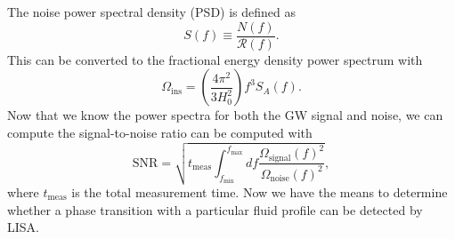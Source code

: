 The noise power spectral density (PSD) is defined as
\cite[eq. 3.1]{gowling_lisa_2021}
\begin{equation}
S(f) \equiv \frac{N(f)}{\mathcal{R}(f)}.
\end{equation}
This can be converted to the fractional energy density power spectrum with
\cites[eq. 3.8]{gowling_lisa_2021}[eq. 59]{smith_lisa_2019}
\begin{equation}
\Omega_\text{ins} = \left( \frac{4 \pi^2}{3 H_0^2} \right) f^3 S_A(f).
\end{equation}
Now that we know the power spectra for both the GW signal and noise, we can compute the signal-to-noise ratio can be computed with
\cites[eq. 50]{smith_lisa_2019}[eq. 33]{caprini_detecting_2020}[eq. 21]{thrane_sensitivity_2013}
\begin{equation}
\text{SNR} = \sqrt{t_\text{meas} \int_{f_\text{min}}^{f_\text{max}} df \frac{\Omega_\text{signal}(f)^2}{\Omega_\text{noise}(f)^2}},
\end{equation}
where $t_\text{meas}$ is the total measurement time.
Now we have the means to determine whether a phase transition with a particular fluid profile can be detected by LISA.
